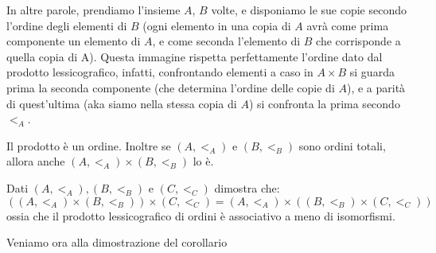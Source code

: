 \documentclass[11pt]{scrartcl}
\begin{document}
In altre parole, prendiamo l'insieme $A$, $B$ volte, e disponiamo le sue copie secondo l'ordine degli elementi di $B$ (ogni elemento in una copia di $A$ avrà come prima componente un elemento di $A$, 
e come seconda l'elemento di $B$ che corrisponde a quella copia di A). Questa immagine rispetta perfettamente l'ordine dato dal prodotto lessicografico, infatti, confrontando elementi a caso in $A \times B$ si guarda
prima la seconda componente (che determina l'ordine delle copie di $A$), e a parità di quest'ultima (aka siamo nella stessa copia di $A$) si confronta la prima secondo $<_A$.

\begin{remark}
	Il prodotto è un ordine. Inoltre se $(A, <_A)$ e $(B,<_B)$ sono ordini totali, allora anche 
	$(A,<_A) \times (B,<_B)$ lo è.
\end{remark}

\begin{exercise}
	Dati $(A,<_A),(B,<_B)$ e $(C,<_C)$ dimostra che:
	\[ ((A,<_A) \times (B,<_B)) \times (C,<_C) = (A,<_A) \times ((B,<_B) \times (C,<_C))
		\]
	ossia che il prodotto lessicografico di ordini è associativo a meno di isomorfismi.
\end{exercise}

Veniamo ora alla dimostrazione del corollario
\end{document}
